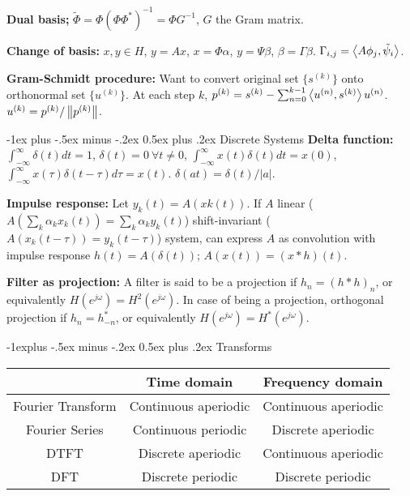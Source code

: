 \documentclass{article}
\makeatletter
\renewcommand{\section}{\@startsection{section}{1}{0mm}%
                                {-1ex plus -.5ex minus -.2ex}%
                                {0.5ex plus .2ex}%
                                {\color{blue!60}\normalfont\normalsize\bfseries}}
\renewcommand{\subsection}{\@startsection{subsection}{2}{0mm}%
                                {-1explus -.5ex minus -.2ex}%
                                {0.5ex plus .2ex}%
                                {\color{red!50!yellow}\normalfont\small\bfseries}}
\makeatother
\begin{document}
\begin{multicols*}{3}
    \textbf{Dual basis; }$\tilde{\Phi}=\Phi(\Phi\Phi^*)^{-1}=\Phi G^{-1}$, $G$ the Gram matrix.
    
    \textbf{Change of basis: }$x,y\in H$, $y=Ax$, $x=\Phi \alpha$, $y=\Psi\beta$, $\beta=\Gamma\beta$. $\Gamma_{i,j}=\left\langle A\phi_j,\tilde{\psi}_i \right\rangle$.
    
    \textbf{Gram-Schmidt procedure: }Want to convert original set $\{s^{(k)}\}$ onto orthonormal set $\{u^{(k)}\}$. At each step $k$, $p^{(k)}=s^{(k)}-\sum_{n=0}^{k-1}\left\langle u^{(n)},s^{(k)} \right\rangle u^{(n)}$. $u^{(k)}=p^{(k)}/\left\lVert p^{(k)}\right\rVert$.
    
    \section{Discrete Systems}
    \textbf{Delta function: }$\int_{-\infty}^\infty \delta(t)dt=1$, $\delta(t)=0\ \forall t\neq 0$, $\int_{-\infty}^\infty x(t)\delta(t)dt=x(0)$, $\int_{-\infty}^\infty x(\tau)\delta(t-\tau)d\tau=x(t)$. $\delta(at) = \delta(t)/|a|$.
    
    \textbf{Impulse response: }Let $y_k(t)=A(xk(t))$. If $A$ linear ($A(\sum_k \alpha_k x_k(t))=\sum_k \alpha_k y_k(t)$) shift-invariant ($A(x_k(t-\tau))=y_k(t-\tau)$) system, can express $A$ as convolution with impulse response $h(t)=A(\delta(t))$; $A(x(t))=(x\ast h)(t)$. 
    
    \textbf{Filter as projection: }A filter is said to be a projection if $h_n=(h\ast h)_n$, or equivalently $H(e^{j\omega})=H^2(e^{j\omega})$. In case of being a projection, orthogonal projection if $h_n=h_{-n}^*$, or equivalently $H(e^{j\omega})=H^*(e^{j\omega})$.
    
    \subsection{Transforms}
    \begin{tabular}{ccc}
        & Time domain & Frequency domain\\
        \toprule
        Fourier Transform & Continuous aperiodic & Continuous aperiodic\\
        \midrule
        Fourier Series & Continuous periodic & Discrete aperiodic \\
        \midrule
        DTFT & Discrete aperiodic & Continuous aperiodic\\
        \midrule
        DFT & Discrete periodic & Discrete periodic\\
        \bottomrule
    \end{tabular}

\end{multicols*}
\end{document}
